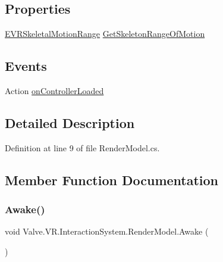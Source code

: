 \subsection*{Properties}
\begin{DoxyCompactItemize}
\item 
\mbox{\hyperlink{namespace_valve_1_1_v_r_affc8d18345f8f5d36f1ae7b4ce534500}{E\+V\+R\+Skeletal\+Motion\+Range}} \mbox{\hyperlink{class_valve_1_1_v_r_1_1_interaction_system_1_1_render_model_aa3bcd80ebf888a64a6720ab7ad517e9f}{Get\+Skeleton\+Range\+Of\+Motion}}
\end{DoxyCompactItemize}
\subsection*{Events}
\begin{DoxyCompactItemize}
\item 
Action \mbox{\hyperlink{class_valve_1_1_v_r_1_1_interaction_system_1_1_render_model_aec08f04ac380054d25b59433f73252e4}{on\+Controller\+Loaded}}
\end{DoxyCompactItemize}


\subsection{Detailed Description}


Definition at line 9 of file Render\+Model.\+cs.



\subsection{Member Function Documentation}
\mbox{\label{class_valve_1_1_v_r_1_1_interaction_system_1_1_render_model_aaba23a0c406c604e2ca10c0f16ae32c7}} 
\subsubsection{\texorpdfstring{Awake()}{Awake()}}
{\footnotesize\ttfamily void Valve.\+V\+R.\+Interaction\+System.\+Render\+Model.\+Awake (\begin{DoxyParamCaption}{ }\end{DoxyParamCaption})\hspace{0.3cm}{\ttfamily [protected]}}



